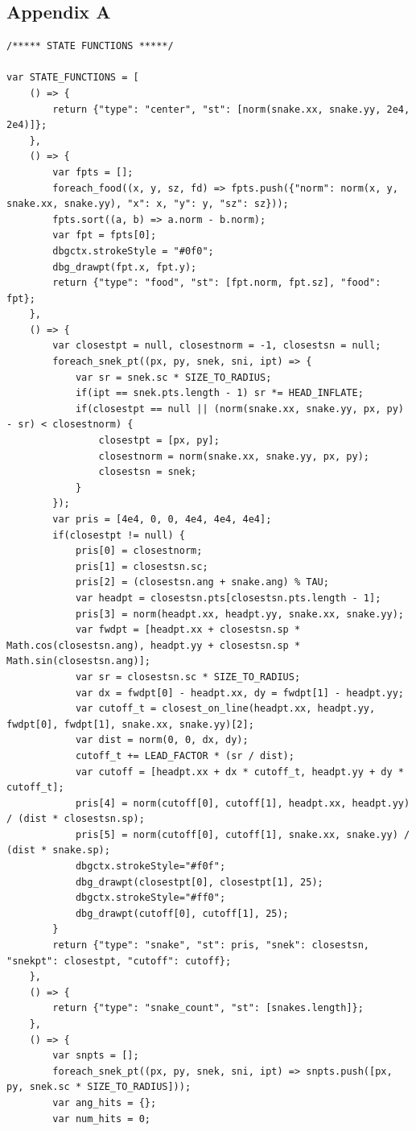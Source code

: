 \documentclass{article}
\begin{document}
\subsection{Appendix A}

	\begin{lstlisting}
/***** STATE FUNCTIONS *****/

var STATE_FUNCTIONS = [
	() => {
		return {"type": "center", "st": [norm(snake.xx, snake.yy, 2e4, 2e4)]};
	},
	() => {
		var fpts = [];
		foreach_food((x, y, sz, fd) => fpts.push({"norm": norm(x, y, snake.xx, snake.yy), "x": x, "y": y, "sz": sz}));
		fpts.sort((a, b) => a.norm - b.norm);
		var fpt = fpts[0];
		dbgctx.strokeStyle = "#0f0";
		dbg_drawpt(fpt.x, fpt.y);
		return {"type": "food", "st": [fpt.norm, fpt.sz], "food": fpt};
	},
	() => {
		var closestpt = null, closestnorm = -1, closestsn = null;
		foreach_snek_pt((px, py, snek, sni, ipt) => {
			var sr = snek.sc * SIZE_TO_RADIUS;
			if(ipt == snek.pts.length - 1) sr *= HEAD_INFLATE;
			if(closestpt == null || (norm(snake.xx, snake.yy, px, py) - sr) < closestnorm) {
				closestpt = [px, py];
				closestnorm = norm(snake.xx, snake.yy, px, py);
				closestsn = snek;
			}
		});
		var pris = [4e4, 0, 0, 4e4, 4e4, 4e4];
		if(closestpt != null) {
			pris[0] = closestnorm;
			pris[1] = closestsn.sc;
			pris[2] = (closestsn.ang + snake.ang) % TAU;
			var headpt = closestsn.pts[closestsn.pts.length - 1];
			pris[3] = norm(headpt.xx, headpt.yy, snake.xx, snake.yy);
			var fwdpt = [headpt.xx + closestsn.sp * Math.cos(closestsn.ang), headpt.yy + closestsn.sp * Math.sin(closestsn.ang)];
			var sr = closestsn.sc * SIZE_TO_RADIUS;
			var dx = fwdpt[0] - headpt.xx, dy = fwdpt[1] - headpt.yy;
			var cutoff_t = closest_on_line(headpt.xx, headpt.yy, fwdpt[0], fwdpt[1], snake.xx, snake.yy)[2];
			var dist = norm(0, 0, dx, dy);
			cutoff_t += LEAD_FACTOR * (sr / dist);
			var cutoff = [headpt.xx + dx * cutoff_t, headpt.yy + dy * cutoff_t];
			pris[4] = norm(cutoff[0], cutoff[1], headpt.xx, headpt.yy) / (dist * closestsn.sp);
			pris[5] = norm(cutoff[0], cutoff[1], snake.xx, snake.yy) / (dist * snake.sp);
			dbgctx.strokeStyle="#f0f";
			dbg_drawpt(closestpt[0], closestpt[1], 25);
			dbgctx.strokeStyle="#ff0";
			dbg_drawpt(cutoff[0], cutoff[1], 25);
		}
		return {"type": "snake", "st": pris, "snek": closestsn, "snekpt": closestpt, "cutoff": cutoff};
	},
	() => {
		return {"type": "snake_count", "st": [snakes.length]};
	},
	() => {
		var snpts = [];
		foreach_snek_pt((px, py, snek, sni, ipt) => snpts.push([px, py, snek.sc * SIZE_TO_RADIUS]));
		var ang_hits = {};
		var num_hits = 0;

\end{lstlisting}
\end{document}
